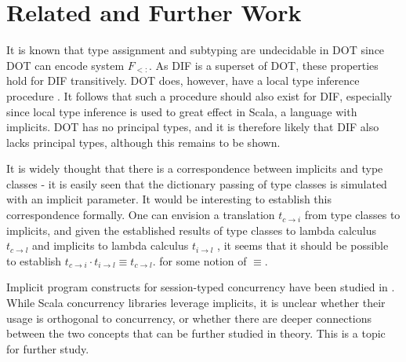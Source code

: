 \section{Related and Further Work}

It is known that type assignment and subtyping are undecidable in DOT
\cite{AR16} since DOT can encode system $F_{<:}$. As DIF is a superset of DOT,
these properties hold for DIF transitively. DOT does, however, have a local type
inference procedure \cite{PT00}. It follows that such a procedure should also
exist for DIF, especially since local type inference is used to great effect in
Scala, a language with implicits. DOT has no principal types, and it is
therefore likely that DIF also lacks principal types, although this remains to
be shown.

It is widely thought that there is a correspondence between implicits and type
classes - it is easily seen that the dictionary passing of type classes is
simulated with an implicit parameter. It would be interesting to establish this
correspondence formally. One can envision a translation $t_{c \rightarrow i}$
from type classes to implicits, and given the established results of type
classes to lambda calculus $t_{c \rightarrow l}$ \cite{WB89} and implicits to
lambda calculus $t_{i \rightarrow l}$ \cite{OBLB18}, it seems that it should be
possible to establish $t_{c \rightarrow i} \cdot t_{i \rightarrow l} \equiv t_{c
\rightarrow l}$. for some notion of $\equiv$.

Implicit program constructs for session-typed concurrency have been studied in
\cite{JB18}. While Scala concurrency libraries leverage implicits, it is unclear
whether their usage is orthogonal to concurrency, or whether there are deeper
connections between the two concepts that can be further studied in theory. This
is a topic for further study.
